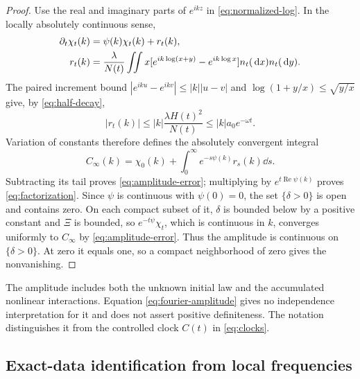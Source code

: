 \begin{proof}
Use the real and imaginary parts of $e^{ikz}$ in
\eqref{eq:normalized-log}. In the locally absolutely continuous sense,
\begin{align}
 \partial_t\chi_t(k)&=\psi(k)\chi_t(k)+r_t(k),\notag\\
 r_t(k)&=\frac\lambda{N(t)}\iint x
  [e^{ik\log(x+y)}-e^{ik\log x}]n_t(\,\mathrm d x)n_t(\,\mathrm d y).
 \label{eq:fourier-source}
\end{align}
The paired increment bound
$|e^{iku}-e^{ikv}|\leq|k||u-v|$ and
$\log(1+y/x)\leq\sqrt{y/x}$ give, by \eqref{eq:half-decay},
\begin{equation}
 |r_t(k)|\leq |k|\frac{\lambda H(t)^2}{N(t)}
             \leq |k|a_0e^{-\omega t}.
 \label{eq:fourier-forcing}
\end{equation}
Variation of constants therefore defines the absolutely convergent integral
\begin{equation}
 C_\infty(k)=\chi_0(k)+\int_0^\infty e^{-s\psi(k)}r_s(k)\dd s.
 \label{eq:fourier-amplitude}
\end{equation}
Subtracting its tail proves \eqref{eq:amplitude-error}; multiplying by
$e^{t\operatorname{Re}\psi(k)}$ proves \eqref{eq:factorization}.
Since $\psi$ is continuous with $\psi(0)=0$, the set $\{\delta>0\}$ is
open and contains zero. On each compact subset of it, $\delta$ is bounded
below by a positive constant and $\Xi$ is bounded, so
$e^{-t\psi}\chi_t$, which is continuous in $k$, converges uniformly to
$C_\infty$ by \eqref{eq:amplitude-error}. Thus the amplitude is
continuous on $\{\delta>0\}$. At zero it equals one, so a compact
neighborhood of zero gives the nonvanishing.
\end{proof}

The amplitude includes both the unknown initial law and the accumulated
nonlinear interactions. Equation \eqref{eq:fourier-amplitude} gives no
independence interpretation for it and does not assert positive
definiteness. The notation distinguishes it from the controlled clock
$C(t)$ in \eqref{eq:clocks}.

\subsection{Exact-data identification from local frequencies}

